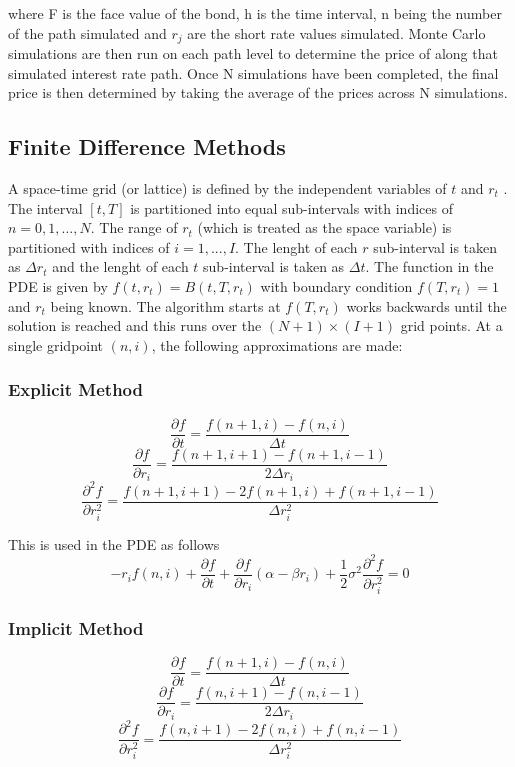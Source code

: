 \documentclass[12pt,a4paper]{article}
\begin{document}
where F is the face value of the bond, h is the time interval, n being the number of the path simulated and $r_{j}$ are the short rate values simulated. Monte Carlo simulations are then run on each path level to determine the price of along that simulated interest rate path. Once N simulations have been completed, the final price is then determined by taking the average of the prices across N simulations.   

\subsection{Finite Difference Methods}
\label{subsec: FD}
A space-time grid (or lattice) is defined by the independent variables of $t$ and $r_t$ \citep{crank}. The interval $[t,T]$ is partitioned into equal sub-intervals with indices of  $n=0,1,...,N$. The range of $r_t$ (which is treated as the space variable) is partitioned with indices of $i = 1,...,I$. The lenght of each $r$ sub-interval is taken as $\Delta r_t$ and the lenght of each $t$ sub-interval is taken as $\Delta t$. The function in the PDE is given by $f(t,r_t)= B(t,T,r_t)$ with boundary condition $f(T,r_t) = 1$ and $r_t$ being known. The algorithm starts at $f(T,r_t)$ works backwards until the solution is reached and this runs over the $(N+1)\times(I+1)$ grid points. At a single gridpoint $(n,i)$, the following approximations are made:
\subsubsection{Explicit Method}
\label{subsubsec: Explicit}
$$\frac{\partial f}{\partial t} = \frac{f(n+1,i) - f(n,i)}{\Delta t}$$
$$\frac{\partial f}{\partial r_i} = \frac{f(n+1,i+1) -f(n+1,i-1)}{2 \Delta r_i}$$
$$\frac{\partial^2 f}{\partial r_i^2} = \frac{f(n+1,i+1) - 2f(n+1,i) +f(n+1,i-1)}{\Delta r_i^2}$$

This is used in the PDE as follows
$$-r_i f(n,i)  + \frac{\partial f}{\partial t} + \frac{\partial f}{\partial r_i}(\alpha - \beta r_i) +\frac{1}{2} \sigma^2 \frac{\partial^2 f}{\partial r_i^2}  = 0 $$

\subsubsection{Implicit Method}
\label{subsubsec: Implicit}
$$\frac{\partial f}{\partial t} = \frac{f(n+1,i) - f(n,i)}{\Delta t}$$
$$\frac{\partial f}{\partial r_i} = \frac{f(n,i+1) -f(n,i-1)}{2 \Delta r_i}$$
$$\frac{\partial^2 f}{\partial r_i^2} = \frac{f(n,i+1) - 2f(n,i) +f(n,i-1)}{\Delta r_i^2}$$
\end{document}
